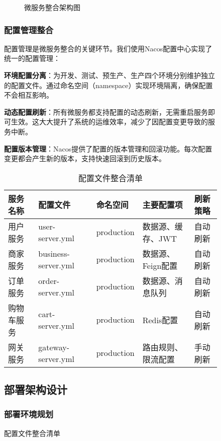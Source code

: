 \documentclass[a4paper,12pt]{article}
\begin{document}
\begin{figure}[H]
\begin{figure}[H]
\begin{tikzpicture}[scale=0.9]
\end{tikzpicture}
\caption{微服务整合架构图}
\label{fig:integration-architecture}
\end{figure}

\subsubsection{配置管理整合}

配置管理是微服务整合的关键环节。我们使用Nacos配置中心实现了统一的配置管理：

\textbf{环境配置分离}：为开发、测试、预生产、生产四个环境分别维护独立的配置文件。通过命名空间（namespace）实现环境隔离，确保配置不会相互影响。

\textbf{动态配置刷新}：所有微服务都支持配置的动态刷新，无需重启服务即可生效。这大大提升了系统的运维效率，减少了因配置变更导致的服务中断。

\textbf{配置版本管理}：Nacos提供了配置的版本管理和回滚功能。每次配置变更都会产生新的版本，支持快速回滚到历史版本。

\begin{table}[H]
\centering
\caption{配置文件整合清单}
\begin{tabular}{|p{3cm}|p{2.5cm}|p{2.5cm}|p{3cm}|p{2.5cm}|}
\hline
\textbf{服务名称} & \textbf{配置文件} & \textbf{命名空间} & \textbf{主要配置项} & \textbf{刷新策略} \\
\hline
用户服务 & user-server.yml & production & 数据源、缓存、JWT & 自动刷新 \\
\hline
商家服务 & business-server.yml & production & 数据源、Feign配置 & 自动刷新 \\
\hline
订单服务 & order-server.yml & production & 数据源、消息队列 & 自动刷新 \\
\hline
购物车服务 & cart-server.yml & production & Redis配置 & 自动刷新 \\
\hline
网关服务 & gateway-server.yml & production & 路由规则、限流配置 & 手动刷新 \\
\hline
\end{tabular}
\end{table}

\subsection{部署架构设计}

\subsubsection{部署环境规划}


\end{figure}
\end{document}

